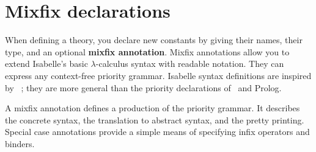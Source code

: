 \section{Mixfix declarations} \label{sec:mixfix}

When defining a theory, you declare new constants by giving their names,
their type, and an optional {\bf mixfix annotation}.  Mixfix annotations
allow you to extend Isabelle's basic $\lambda$-calculus syntax with
readable notation.  They can express any context-free priority grammar.
Isabelle syntax definitions are inspired by \OBJ~\cite{OBJ}; they are more
general than the priority declarations of \ML\ and Prolog.

A mixfix annotation defines a production of the priority grammar.  It
describes the concrete syntax, the translation to abstract syntax, and the
pretty printing.  Special case annotations provide a simple means of
specifying infix operators and binders.


%


